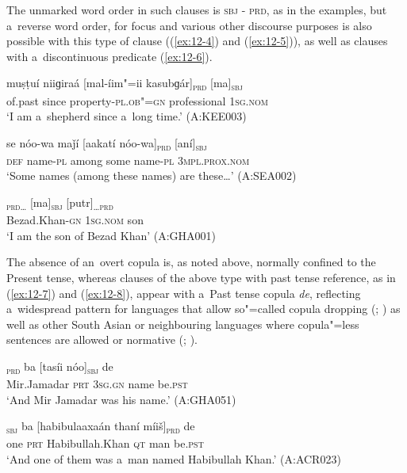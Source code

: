 The unmarked word order in such clauses is \textsc{sbj - prd}, as in the examples, but a~reverse word order, for focus and various other discourse purposes is also possible with this type of clause ((\ref{ex:12-4}) and (\ref{ex:12-5})), as well as clauses with a~discontinuous predicate (\ref{ex:12-6}).

\begin{exe}
\ex
\label{ex:12-4}
\gll muṣṭuí niiɡiraá [mal-íim"=ii kasubɡár]\textsubscript{\textsc{prd}} [ma]\textsubscript{\textsc{sbj}} \\
of.past since property-\textsc{pl.ob"=gn} professional \textsc{1sg.nom}  \\
\glt `I am a~shepherd since a~long time.' (A:KEE003)
\end{exe}
\begin{exe}
\ex
\label{ex:12-5}
\gll se nóo-wa maǰí [aakatí nóo-wa]\textsubscript{\textsc{prd}} [aní]\textsubscript{\textsc{sbj}} \\
\textsc{def} name-\textsc{pl} among some name-\textsc{pl} 3\textsc{mpl.prox.nom} \\
\glt `Some names (among these names) are these{\ldots}' (A:SEA002)
\end{exe}
\begin{exe}
\ex
\label{ex:12-6}
\gll [beezaadxaan-íi]\textsubscript{\textsc{prd{\ldots}}} [ma]\textsubscript{\textsc{sbj}} [putr]\textsubscript{\textsc{{\ldots}prd}} \\
Bezad.Khan-\textsc{gn} \textsc{1sg.nom} son  \\
\glt `I am the son of Bezad Khan' (A:GHA001)
\end{exe}

The absence of an~overt copula is, as noted above, normally confined to the Present tense, whereas clauses of the above type with past tense reference, as in (\ref{ex:12-7}) and (\ref{ex:12-8}), appear with a~Past tense copula \textit{de}, reflecting a~widespread pattern for languages that allow so"=called copula dropping (\citealt[34]{pustet2003}; \citealt[120]{givon2001a}) as well as other South Asian or neighbouring languages where copula"=less sentences are allowed or normative (\citealt[339]{masica1991}; \citealt[121]{baart1999a}).

\begin{exe}
\ex
\label{ex:12-7}
\gll [miirǰamadaár]\textsubscript{\textsc{prd}} ba [tasíi nóo]\textsubscript{\textsc{sbj}} de \\
Mir.Jamadar \textsc{prt} \textsc{3sg.gn} name be.\textsc{pst} \\
\glt `And Mir Jamadar was his name.' (A:GHA051)
\end{exe}
\begin{exe}
\ex
\label{ex:12-8}
\gll [áak]\textsubscript{\textsc{sbj}} ba [habibulaaxaán thaní míiš]\textsubscript{\textsc{prd}} de \\
one \textsc{prt} Habibullah.Khan \textsc{qt} man be.\textsc{pst} \\
\glt `And one of them was a~man named Habibullah Khan.' (A:ACR023)
\end{exe}

